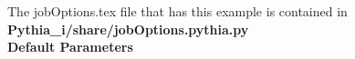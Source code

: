\documentclass[11pt]{article}
\begin{document}

The jobOptions.tex file that has this example is contained in {\bf Pythia\_i/share/jobOptions.pythia.py }\\


{\large \bf Default Parameters}\\
\end{document}
